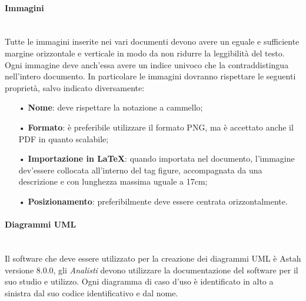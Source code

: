 \paragraph{Immagini}\mbox{}\\
Tutte le immagini inserite nei vari documenti devono avere un eguale e sufficiente margine orizzontale e verticale in modo da non ridurre la leggibilità del testo. Ogni immagine deve anch'essa avere un indice univoco che la contraddistingua nell'intero documento.
In particolare le immagini dovranno rispettare le seguenti proprietà, salvo indicato diversamente:
\begin{itemize}
\item[•] \textbf{Nome}: deve rispettare la {notazione a cammello};
\item[•] \textbf{Formato}: è preferibile utilizzare il formato PNG, ma è accettato anche il PDF in quanto scalabile;
\item[•] \textbf{Importazione in \LaTeX}: quando importata nel documento, l'immagine dev'essere collocata all'interno del tag figure, accompagnata da una descrizione e con lunghezza massima uguale a 17cm;
\item[•] \textbf{Posizionamento}: preferibilmente deve essere centrata orizzontalmente.
\end{itemize}

\paragraph{Diagrammi UML}\mbox{}\\
Il software che deve essere utilizzato per la creazione dei diagrammi UML è Astah versione 8.0.0, gli \textit{Analisti} devono utilizzare la documentazione del software per il suo studio e utilizzo.
Ogni diagramma di caso d’uso è identificato in alto a sinistra dal suo codice identificativo e dal nome.

